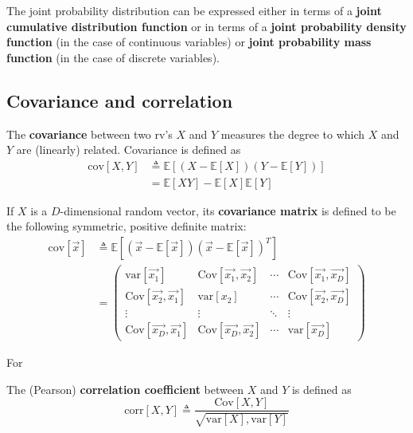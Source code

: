 The joint probability distribution can be expressed either in terms of a \textbf{joint cumulative distribution function} or in terms of a \textbf{joint probability density function} (in the case of continuous variables) or \textbf{joint probability mass function} (in the case of discrete variables). 


\subsection{Covariance and correlation}
\begin{definition}
The \textbf{covariance} between two rv’s $X$ and $Y$ measures the degree to which $X$ and $Y$ are (linearly) related. Covariance is defined as
\begin{equation}
\begin{split}
\mathrm{cov}[X,Y] & \triangleq \mathbb{E}\left[(X-\mathbb{E}[X])(Y-\mathbb{E}[Y])\right] \\
         & =\mathbb{E}[XY]-\mathbb{E}[X]\mathbb{E}[Y]
\end{split}
\end{equation}
\end{definition}

\begin{definition}
If $X$ is a $D$-dimensional random vector, its \textbf{covariance matrix} is defined to be the following symmetric, positive definite matrix:
\begin{align}
\mathrm{cov}[\vec{x}] & \triangleq \mathbb{E}\left[(\vec{x}-\mathbb{E}[\vec{x}])(\vec{x}-\mathbb{E}[\vec{x}])^T\right] \\
       &  = \left( \begin{array}{cccc}
           \text{var}[\vec{x_1}] & \text{Cov}[\vec{x_1},\vec{x_2}] & \cdots & \text{Cov}[\vec{x_1},\vec{x_D}] \\
           \text{Cov}[\vec{x_2},\vec{x_1}] & \text{var}[x_2] & \cdots & \text{Cov}[\vec{x_2},\vec{x_D}] \\
		   \vdots & \vdots & \ddots & \vdots \\
           \text{Cov}[\vec{x_D},\vec{x_1}] & \text{Cov}[\vec{x_D},\vec{x_2}] & \cdots & \text{var}[\vec{x_D}] \end{array} \right)
\end{align}
\end{definition}
For 

\begin{definition}
The (Pearson) \textbf{correlation coefficient} between $X$ and $Y$ is defined as
\begin{equation}
\text{corr}[X,Y] \triangleq \dfrac{\text{Cov}[X,Y]}{\sqrt{\text{var}[X],\text{var}[Y]}}
\end{equation}
\end{definition}

